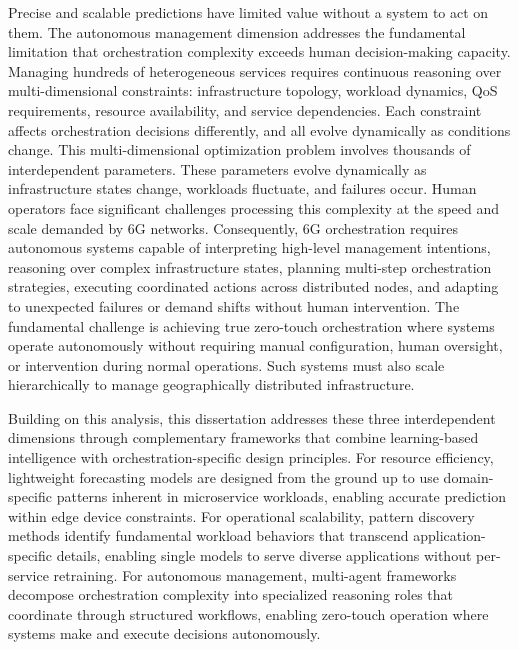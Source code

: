 Precise and scalable predictions have limited value without a system to act on them. The autonomous management dimension addresses the fundamental limitation that orchestration complexity exceeds human decision-making capacity. Managing hundreds of heterogeneous services requires continuous reasoning over multi-dimensional constraints: infrastructure topology, workload dynamics, \ac{QoS} requirements, resource availability, and service dependencies. Each constraint affects orchestration decisions differently, and all evolve dynamically as conditions change. This multi-dimensional optimization problem involves thousands of interdependent parameters. These parameters evolve dynamically as infrastructure states change, workloads fluctuate, and failures occur. Human operators face significant challenges processing this complexity at the speed and scale demanded by \ac{6G} networks. Consequently, \ac{6G} orchestration requires autonomous systems capable of interpreting high-level management intentions, reasoning over complex infrastructure states, planning multi-step orchestration strategies, executing coordinated actions across distributed nodes, and adapting to unexpected failures or demand shifts without human intervention. The fundamental challenge is achieving true zero-touch orchestration where systems operate autonomously without requiring manual configuration, human oversight, or intervention during normal operations. Such systems must also scale hierarchically to manage geographically distributed infrastructure.

Building on this analysis, this dissertation addresses these three interdependent dimensions through complementary frameworks that combine learning-based intelligence with orchestration-specific design principles. For resource efficiency, lightweight forecasting models are designed from the ground up to use domain-specific patterns inherent in microservice workloads, enabling accurate prediction within edge device constraints. For operational scalability, pattern discovery methods identify fundamental workload behaviors that transcend application-specific details, enabling single models to serve diverse applications without per-service retraining. For autonomous management, multi-agent frameworks decompose orchestration complexity into specialized reasoning roles that coordinate through structured workflows, enabling zero-touch operation where systems make and execute decisions autonomously.

